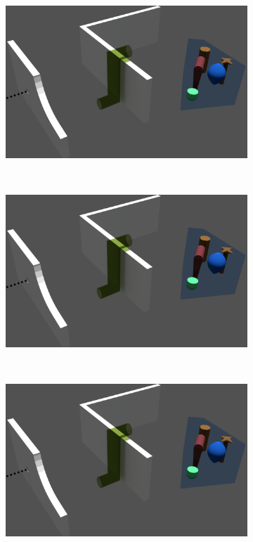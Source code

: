 \documentclass[12pt,a4]{article}
\begin{document}
\begin{figure}[ht!]
    \centering
    \begin{subfigure}{0.3\textwidth}
        \centering
        \includegraphics[width=1\linewidth]{figures/figscene.png}
   
    \end{subfigure}%
    ~
        \begin{subfigure}{0.3\textwidth}
        \centering
        \includegraphics[width=1\linewidth]{figures/figscene.png}
       
    \end{subfigure}
        ~
        \begin{subfigure}{0.3\textwidth}
        \centering
        \includegraphics[width=1\linewidth]{figures/figscene.png}
       

\end{subfigure}
\end{figure}
\end{document}

